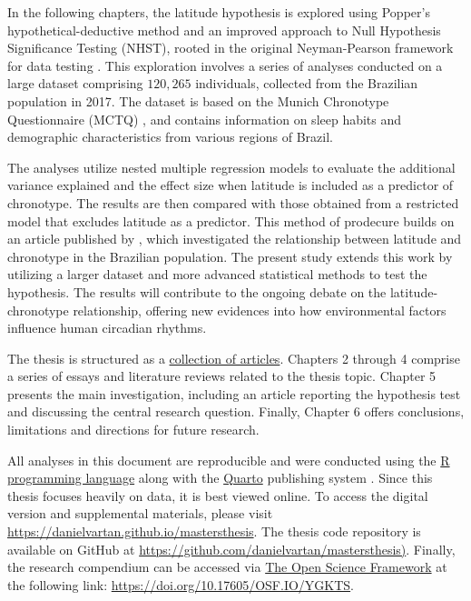 \documentclass[
12pt,
openright,
oneside,
a4paper,
chapter=TITLE,
section=TITLE,
french,
spanish,
brazil,
english
]{abntex2}\usepackage{array}
\begin{document}
In the following chapters, the latitude hypothesis is explored using
Popper's hypothetical-deductive method \autocite{popper1979} and an
improved approach to Null Hypothesis Significance Testing (NHST), rooted
in the original Neyman-Pearson framework for data testing
\autocite{neyman1928,neyman1928a,perezgonzalez2015}. This exploration
involves a series of analyses conducted on a large dataset comprising
\(120,265\) individuals, collected from the Brazilian population in
2017. The dataset is based on the Munich Chronotype Questionnaire (MCTQ)
\autocite{roenneberg2003,roenneberg2012a}, and contains information on
sleep habits and demographic characteristics from various regions of
Brazil.

The analyses utilize nested multiple regression models to evaluate the
additional variance explained and the effect size when latitude is
included as a predictor of chronotype. The results are then compared
with those obtained from a restricted model that excludes latitude as a
predictor. This method of prodecure builds on an article published by
\textcite{leocadio-miguel2017}, which investigated the relationship
between latitude and chronotype in the Brazilian population. The present
study extends this work by utilizing a larger dataset and more advanced
statistical methods to test the hypothesis. The results will contribute
to the ongoing debate on the latitude-chronotype relationship, offering
new evidences into how environmental factors influence human circadian
rhythms.

The thesis is structured as a
\href{https://en.wikipedia.org/wiki/Collection_of_articles}{collection
of articles}. Chapters 2 through 4 comprise a series of essays and
literature reviews related to the thesis topic. Chapter 5 presents the
main investigation, including an article reporting the hypothesis test
and discussing the central research question. Finally, Chapter 6 offers
conclusions, limitations and directions for future research.

All analyses in this document are reproducible and were conducted using
the \href{https://www.r-project.org/}{R programming language}
\autocite{rcoreteam} along with the \href{https://quarto.org/}{Quarto}
publishing system \autocite{allaire}. Since this thesis focuses heavily
on data, it is best viewed online. To access the digital version and
supplemental materials, please visit
\href{https://danielvartan.github.io/mastersthesis/}{https://danielvartan.github.io/mastersthesis}.
The thesis code repository is available on GitHub at
\href{https://github.com/danielvartan/mastersthesis}{https://github.com/danielvartan/mastersthesis)}.
Finally, the research compendium can be accessed via
\href{https://osf.io/}{The Open Science Framework} at the following
link: \url{https://doi.org/10.17605/OSF.IO/YGKTS}.
\end{document}
